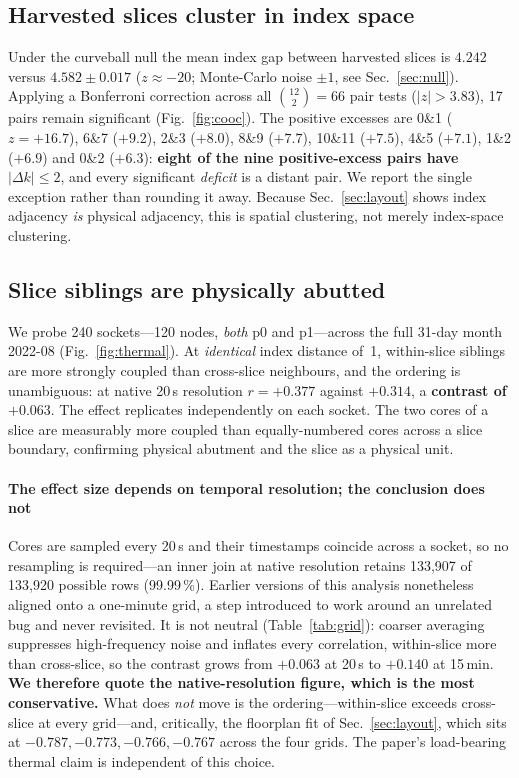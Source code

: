\documentclass[10pt,conference]{IEEEtran}
\begin{document}
\subsection{Harvested slices cluster in index space}
\label{sec:cluster}
Under the curveball null the mean index gap between harvested slices is $4.242$ versus
$4.582\pm0.017$ ($z\approx-20$; Monte-Carlo noise $\pm1$, see Sec.~\ref{sec:null}). Applying a
Bonferroni correction across all $\binom{12}{2}=66$ pair
tests ($|z|>3.83$), 17 pairs remain significant (Fig.~\ref{fig:cooc}). The positive excesses are
0\&1 ($z=+16.7$), 6\&7 ($+9.2$), 2\&3 ($+8.0$), 8\&9 ($+7.7$), 10\&11 ($+7.5$), 4\&5 ($+7.1$),
1\&2 ($+6.9$) and 0\&2 ($+6.3$): \textbf{eight of the nine positive-excess pairs have
$|\Delta k|\le2$}, and every significant \emph{deficit} is a distant pair. We report the single
exception rather than rounding it away. Because Sec.~\ref{sec:layout} shows index adjacency
\emph{is} physical adjacency, this is spatial clustering, not merely index-space clustering.

\subsection{Slice siblings are physically abutted}
We probe 240 sockets---120 nodes, \emph{both} p0 and p1---across the full 31-day month 2022-08
(Fig.~\ref{fig:thermal}). At \emph{identical} index distance of~1, within-slice siblings are more
strongly coupled than cross-slice neighbours, and the ordering is unambiguous: at native 20\,s
resolution $r=+0.377$ against $+0.314$, a \textbf{contrast of $+0.063$}. The effect replicates
independently on each socket. The two cores of a slice are measurably more coupled than
equally-numbered cores across a slice boundary, confirming physical abutment and the slice as a
physical unit.

\paragraph*{The effect size depends on temporal resolution; the conclusion does not}
\label{par:grid}
Cores are sampled every 20\,s and their timestamps coincide across a socket, so no resampling is
required---an inner join at native resolution retains 133{,}907 of 133{,}920 possible rows
(99.99\,\%). Earlier versions of this analysis nonetheless aligned onto a one-minute grid, a step
introduced to work around an unrelated bug and never revisited. It is not neutral
(Table~\ref{tab:grid}): coarser averaging suppresses high-frequency noise and inflates every
correlation, within-slice more than cross-slice, so the contrast grows from $+0.063$ at 20\,s to
$+0.140$ at 15\,min. \textbf{We therefore quote the native-resolution figure, which is the most
conservative.} What does \emph{not} move is the ordering---within-slice exceeds cross-slice at
every grid---and, critically, the floorplan fit of Sec.~\ref{sec:layout}, which sits at
$-0.787,-0.773,-0.766,-0.767$ across the four grids. The paper's load-bearing thermal claim is
independent of this choice.
\end{document}
